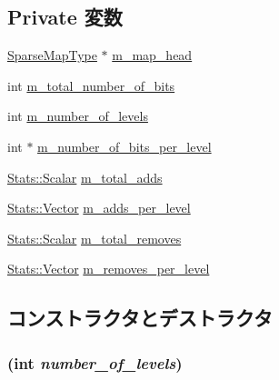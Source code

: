 \subsection*{Private 変数}
\begin{DoxyCompactItemize}
\item 
\hyperlink{SparseMemory_8hh_a93e9b04c329a9452d20206c8e31a4172}{SparseMapType} $\ast$ \hyperlink{classSparseMemory_ac362ddde239afefba05ba5bfc62708c3}{m\_\-map\_\-head}
\item 
int \hyperlink{classSparseMemory_afa143dbd3f54d7d1568d199a762a2a6c}{m\_\-total\_\-number\_\-of\_\-bits}
\item 
int \hyperlink{classSparseMemory_a29e40197e4f3ec21061a02ee9a3dd5eb}{m\_\-number\_\-of\_\-levels}
\item 
int $\ast$ \hyperlink{classSparseMemory_a01825402432aab0b3129f1cf4e84c670}{m\_\-number\_\-of\_\-bits\_\-per\_\-level}
\item 
\hyperlink{classStats_1_1Scalar}{Stats::Scalar} \hyperlink{classSparseMemory_af76a2ea16aef8c95f5f840cd1cd0990c}{m\_\-total\_\-adds}
\item 
\hyperlink{classStats_1_1Vector}{Stats::Vector} \hyperlink{classSparseMemory_a3a3ab3ffc66149c4195aaa11285f544b}{m\_\-adds\_\-per\_\-level}
\item 
\hyperlink{classStats_1_1Scalar}{Stats::Scalar} \hyperlink{classSparseMemory_a0adb1789aac47c7bc6fffcdd2f8e9df3}{m\_\-total\_\-removes}
\item 
\hyperlink{classStats_1_1Vector}{Stats::Vector} \hyperlink{classSparseMemory_a26fd7b44dcff75112173b9672dfc21b6}{m\_\-removes\_\-per\_\-level}
\end{DoxyCompactItemize}


\subsection{コンストラクタとデストラクタ}
\hypertarget{classSparseMemory_a8e670627f220953e5f45aa5308bdeb4f}{
\subsubsection[{SparseMemory}]{ (int {\em number\_\-of\_\-levels})}}
\label{classSparseMemory_a8e670627f220953e5f45aa5308bdeb4f}



